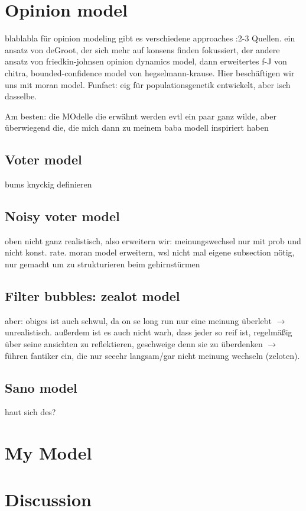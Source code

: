 \documentclass[12pt,a4paper,twoside]{article}
\begin{document}
\section{Opinion model}
blablabla für opinion modeling gibt es verschiedene approaches :2-3 Quellen. ein ansatz von deGroot, der sich mehr auf konsens finden fokussiert, der andere ansatz von friedkin-johnsen opinion dynamics model, dann erweitertes f-J von chitra, bounded-confidence model von hegselmann-krause. Hier beschäftigen wir uns mit moran model. Funfact: eig für populationsgenetik entwickelt, aber isch dasselbe.

Am besten: die MOdelle die erwähnt werden evtl ein paar ganz wilde, aber überwiegend die, die mich dann zu meinem baba modell inspiriert haben
\subsection{Voter model}
bums knyckig definieren
\subsection{Noisy voter model}
oben nicht ganz realistisch, also erweitern wir: meinungswechsel nur mit prob und nicht konst. rate.
moran model erweitern, wsl nicht mal eigene subsection nötig, nur gemacht um zu strukturieren beim gehirnstürmen
\subsection{Filter bubbles: zealot model}
aber: obiges ist auch schwul, da on se long run nur eine meinung überlebt $\rightarrow$ unrealistisch. außerdem ist es auch nicht warh, dass jeder so reif ist, regelmäßig über seine ansichten zu reflektieren, geschweige denn sie zu überdenken $\rightarrow$ führen fantiker ein, die nur seeehr langsam/gar nicht meinung wechseln (zeloten).
\subsection{Sano model}
haut sich des? %
\section{My Model}
\section{Discussion}

\newpage
\printbibliography
\end{document}
